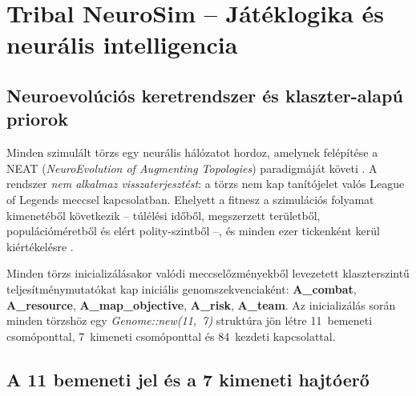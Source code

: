 \chapter{Tribal NeuroSim -- Játéklogika és neurális intelligencia}

\section{Neuroevolúciós keretrendszer és klaszter-alapú priorok}

Minden szimulált törzs egy neurális hálózatot hordoz, amelynek felépítése a NEAT (\textit{NeuroEvolution of Augmenting Topologies}) paradigmáját követi \cite{stanleymiikkulainen2002}. A rendszer \textit{nem alkalmaz visszaterjesztést}: a törzs nem kap tanítójelet valós League of Legends meccsel kapcsolatban. Ehelyett a fitnesz a szimulációs folyamat kimenetéből következik -- túlélési időből, megszerzett területből, populációméretből és elért polity-szintből --, és minden ezer tickenként kerül kiértékelésre \cite{holland1992}.

Minden törzs inicializálásakor valódi meccselőzményekből levezetett klaszterszintű teljesítménymutatókat kap iniciális genomszekvenciaként: \textbf{A\_combat}, \textbf{A\_resource}, \textbf{A\_map\_objective}, \textbf{A\_risk}, \textbf{A\_team}. Az inicializálás során minden törzshöz egy \textit{Genome::new(11,~7)} struktúra jön létre 11~bemeneti csomóponttal, 7~kimeneti csomóponttal és 84~kezdeti kapcsolattal.

\section{A 11 bemeneti jel és a 7 kimeneti hajtóerő}

